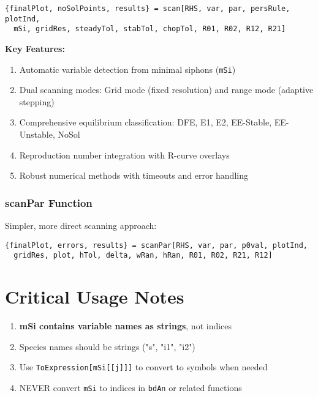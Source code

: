 \documentclass{article}
\begin{document}
\begin{verbatim}
{finalPlot, noSolPoints, results} = scan[RHS, var, par, persRule, plotInd,
  mSi, gridRes, steadyTol, stabTol, chopTol, R01, R02, R12, R21]
\end{verbatim}

\textbf{Key Features:}
\begin{enumerate}
\item Automatic variable detection from minimal siphons (\texttt{mSi})
\item Dual scanning modes: Grid mode (fixed resolution) and range mode (adaptive stepping)
\item Comprehensive equilibrium classification: DFE, E1, E2, EE-Stable, EE-Unstable, NoSol
\item Reproduction number integration with R-curve overlays
\item Robust numerical methods with timeouts and error handling
\end{enumerate}

\subsubsection{scanPar Function}
Simpler, more direct scanning approach:

\begin{verbatim}
{finalPlot, errors, results} = scanPar[RHS, var, par, p0val, plotInd,
  gridRes, plot, hTol, delta, wRan, hRan, R01, R02, R21, R12]
\end{verbatim}

\section{Critical Usage Notes}

  \begin{tcolorbox}[colback=red!5!white,colframe=red!75!black,title=Critical Variable Handling Rules]
\begin{enumerate}
    \item \textbf{mSi contains variable names as strings}, not indices
    \item Species names should be strings ("s", "i1", "i2")
    \item Use \texttt{ToExpression[mSi[[j]]]} to convert to symbols when needed
    \item NEVER convert \texttt{mSi} to indices in \texttt{bdAn} or related functions
\end{enumerate}
\end{tcolorbox}
\end{document}
